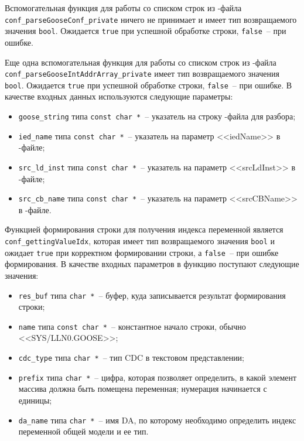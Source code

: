 Вспомогательная функция для работы со списком строк из \cid-файла \lstinline{conf_parseGooseConf_private} ничего не принимает и имеет тип возвращаемого
значения \lstinline{bool}. Ожидается \lstinline{true} при  успешной обработке строки, \lstinline{false}~-- при ошибке.

Еще одна вспомогательная функция для работы со списком строк из \cid-файла \lstinline{conf_parseGooseIntAddrArray_private} имеет тип возвращаемого
значения \lstinline{bool}. Ожидается \lstinline{true} при  успешной обработке строки, \lstinline{false}~-- при ошибке. В качестве входных данных используются следующие параметры:

\begin{itemize}
    \item \lstinline{goose_string} типа \lstinline{const char *}~-- указатель на строку \cid-файла для разбора;
    \item \lstinline{ied_name} типа \lstinline{const char *}~-- указатель на параметр <<iedName>> в \cid-файле;
    \item \lstinline{src_ld_inst} типа \lstinline{const char *}~-- указатель на параметр <<srcLdInst>> в \cid-файле;
    \item \lstinline{src_cb_name} типа \lstinline{const char *}~-- указатель на параметр <<srcCBName>> в \cid-файле.
\end{itemize}

Функцией формирования строки для получения индекса переменной является \lstinline{conf_gettingValueIdx}, которая имеет тип возвращаемого значения \lstinline{bool} и
ожидает \lstinline{true} при корректном формировании строки, а \lstinline{false}~-- при ошибке формирования. В качестве входных параметров в функцию поступают следующие значения:

\begin{itemize}
    \item \lstinline{res_buf} типа \lstinline{char *}~-- буфер, куда записывается результат формирования строки;
    \item \lstinline{name} типа \lstinline{const char *}~-- константное начало строки, обычно <<SYS/LLN0.GOOSE>>;
    \item \lstinline{cdc_type} типа \lstinline{char *}~-- тип CDC в текстовом представлении;
    \item \lstinline{prefix} типа \lstinline{char *}~-- цифра, которая позволяет определить, в какой элемент массива должна быть помещена переменная; нумерация начинается с единицы;
    \item \lstinline{da_name} типа \lstinline{char *}~-- имя DA, по которому необходимо определить индекс переменной общей модели и ее тип.
\end{itemize}

